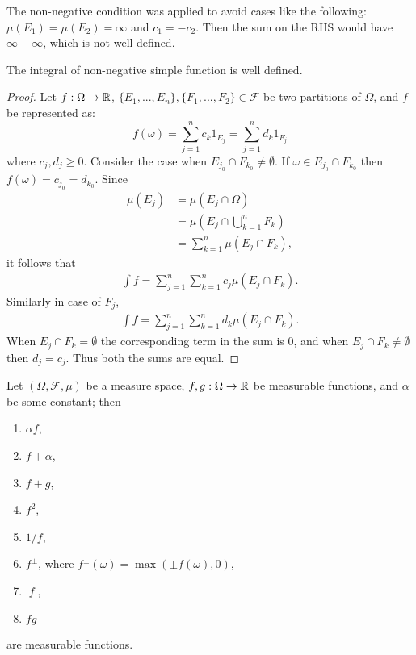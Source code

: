 The non-negative condition was applied to avoid cases like the following: $\mu(E_1)= \mu(E_2)= \infty$ and $c_1 = -c_2$. Then the sum on the RHS would have $\infty - \infty$, which is not well defined.  
\begin{proposition}
  The integral of non-negative simple function is well defined.
\end{proposition}
\begin{proof}
  Let $f:\Omega\to\mathbb{R}$, $\{E_1,...,E_n\}, \{F_1,...,F_2\}\in \mathscr{F}$ be two partitions of $\Omega$, and $f$ be represented as:
  \[f(\omega) = \sum_{j=1}^n c_k 1_{E_j} = \sum_{j=1}^n d_k 1_{F_j}\]
  where $c_j,d_j\geq 0$. Consider the case when $E_{j_0}\cap F_{k_0} \neq \emptyset$. If $\omega \in E_{j_0}\cap F_{k_0}$ then $f(\omega) = c_{j_0} = d_{k_0}$. Since
  \begin{align*}
    \mu(E_j) &= \mu(E_j \cap \Omega)\\
          &= \mu(E_j \cap \bigcup_{k=1}^n F_k)\\
          &= \sum_{k=1}^n \mu(E_j\cap F_k),
  \end{align*}
  it follows that
  \begin{align*}
    \int f = \sum_{j=1}^n \sum_{k=1}^n c_j \mu(E_j\cap F_k).
  \end{align*}
  Similarly in case of $F_j$,
  \begin{align*}
    \int f = \sum_{j=1}^n \sum_{k=1}^n d_k \mu(E_j\cap F_k).
  \end{align*}
  When $E_j\cap F_k = \emptyset$ the corresponding term in the sum is $0$, and when $E_j\cap F_k \neq \emptyset$ then $d_j=c_j$. Thus both the sums are equal. 
\end{proof}
\begin{lemma}
  Let $(\Omega, \mathscr{F}, \mu)$ be a measure space, $f,g: \Omega \to \mathbb{R}$ be measurable functions, and $\alpha$ be some constant; then
  \begin{enumerate}
    \item $\alpha f$, 
    \item $f + \alpha$, 
    \item $f+g$,
    \item $f^2$,
    \item $1/f$,
    \item $f^\pm$, where $f^\pm(\omega) = \max(\pm f(\omega), 0)$,
    \item $|f|$,
    \item $fg$
  \end{enumerate}
  are measurable functions.
\end{lemma}
